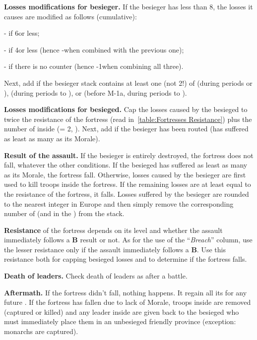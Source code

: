 \textbf{Losses modifications for besieger.} If the besieger has less than
8\LD, the losses it causes are modified as follows (cumulative):
\begin{modlist}
\item[-\texttu] if 6\LD or less;
\item[-\texttu] if 4\LD or less (hence -\texttd when combined with the
  previous one);
\item[-\texttd] if there is no \ARMY counter (hence -1\texttu when combining
  all three).
\end{modlist}
Next, add \texttd if the besieger stack contains at least one \ARMY\faceplus
(not 2\ARMY\facemoins !) of \POL (during periods  or ),
\RUS (during periods  to ), or \TUR \Janissaire (before
M-1a, during periods  to ).


\textbf{Losses modifications for besieged.} Cap the losses caused by the
besieged to twice the resistance of the fortress (read
in~\ref{table:Fortresses Resistance}) plus the number of \LD inside
(\ARMY\facemoins = 2\LD, \ARMY{}\LD). Next, add \texttd if the
besieger has been routed (has suffered as least as many \textetoile as its
Morale).

\textbf{Result of the assault.} If the besieger is entirely destroyed, the
fortress does not fall, whatever the other conditions. If the besieged has
suffered as least as many \textetoile as its Morale, the fortress
fall. Otherwise, losses caused by the besieger are first used to kill troops
inside the fortress. If the remaining losses are at least equal to the
resistance of the fortress, it falls. Losses suffered by the besieger are
rounded to the nearest integer in Europe and then simply remove the
corresponding number of \LD (and \LDE in the \ROTW) from the stack.

\textbf{Resistance} of the fortress depends on its level and whether the
assault immediately follows a \textbf{B} result or not. As for the use of the
``\emph{Breach}'' column, use the lesser resistance only if the assault
immediately follows a \textbf{B}. Use this resistance both for capping
besieged losses and to determine if the fortress falls.

\textbf{Death of leaders.} Check death of leaders as after a battle.

\textbf{Aftermath.} If the fortress didn't fall, nothing happens. It regain
all its  for any future . If the fortress has
fallen due to lack of Morale, troops inside are removed (captured or killed)
and any leader inside are given back to the besieged who must immediately
place them in an unbesieged friendly province (exception: monarchs are
captured).

